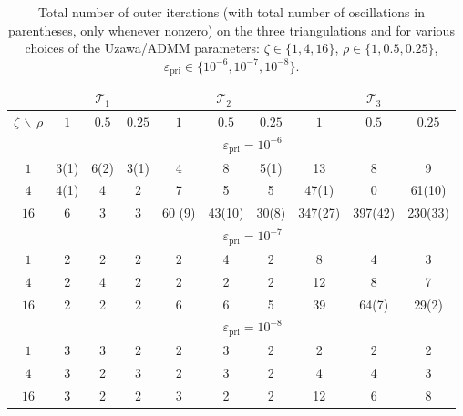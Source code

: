 \documentclass[a4paper,11pt]{article}
\theoremstyle{definition}
\theoremstyle{remark}
\numberwithin{equation}{section}
\begin{document}
\begin{table}[htb]
\centering
\begin{tabular}{|c|ccc|ccc|ccc|}
\hline
&\multicolumn{3}{|c|}{$\mathcal{T}_1$}&\multicolumn{3}{|c|}{$\mathcal{T}_2$}&\multicolumn{3}{|c|}{$\mathcal{T}_3$}\\ \hline
$\zeta\, \backslash\,\rho $ & $1$ &  $0.5$ &  $0.25$ & $1$ &  $0.5$ &  $0.25$ & $1$ &  $0.5$ &  $0.25$ \\
\hline
&\multicolumn{9}{|c|}{$\varepsilon_{\text{pri}}=10^{-6}$}\\\hline
$1$   & 3(1)  &   6(2)   &  3(1)& 4  &   8  &   5(1) & 13   &  8  &9   \\
$4$   &4(1)   &   4      &   2  & 7  &   5  &   5 & 47(1)   &  0  &61(10)  \\
$16$  &6      &   3      &   3  & 60 (9) &  43(10)  &   30(8) & 347(27)  &  397(42) & 230(33)  \\      
\hline
&\multicolumn{9}{|c|}{$\varepsilon_{\text{pri}}=10^{-7}$}\\
\hline
$1$& 2  &   2   &  2 & 2  &   4 &    2  &  8    & 4  &   3   \\
$4$& 2  &   4   &  2 &2   &  2  &   2&  12   &  8  &   7   \\
$16$&2  &   2   &  2 & 6   &  6   &  5& 39  &   64(7)  &   29(2)\\
\hline  
&\multicolumn{9}{|c|}{$\varepsilon_{\text{pri}}=10^{-8}$}\\
\hline
$1$& 3  &   3   &  2 & 2  &   3 &    2& 2  &   2 &    2\\
$4$&3   &  2  &   3 & 2   &  3    & 2 & 4   &  4    & 3\\
$16$&3  &   2   &  2 & 3   &  2   &  2 &12   &  6   &  8 \\
\hline
\end{tabular}
\caption{Total number of outer iterations (with total number of oscillations in parentheses, only whenever nonzero) on the three triangulations  and for various choices of the Uzawa/ADMM parameters: $\zeta\in\{1,4,16\}$, $\rho\in\{1,0.5,0.25\}$, $\varepsilon_{\text{pri}} \in \{10^{-6},10^{-7},10^{-8}\}$.}
\label{Tab:energ-osc}
\end{table}
\end{document}
